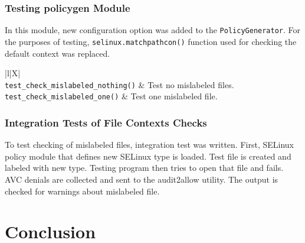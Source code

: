 \subsection{Testing policygen Module}
In this module, new configuration option was added to the
\texttt{PolicyGenerator}. For the purposes of testing,
\texttt{selinux.matchpathcon()} function used for checking the default context
was replaced. 
\begin{longtabu}{|l|X|} \hline
    \\ \hline
    \texttt{test\_check\_mislabeled\_nothing()} & Test no mislabeled files.
    \\ \hline
    \texttt{test\_check\_mislabeled\_one()} & Test one mislabeled file.
    \\ \hline
\end{longtabu}

\subsection{Integration Tests of File Contexts Checks}
To test checking of mislabeled files, integration test was written. First,
SELinux policy module that defines new SELinux type is loaded. Test file is
created and labeled with new type. Testing program then tries to open that
file and fails. AVC denials are collected and sent to the audit2allow utility.
The output is checked for warnings about mislabeled file.

\chapter{Conclusion}


